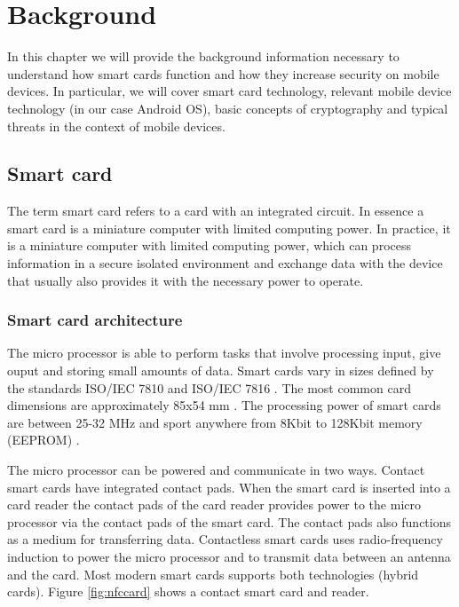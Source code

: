 \chapter{Background}
In this chapter we will provide the background information necessary to understand how smart cards function and how they increase security on mobile devices. In particular, we will cover smart card technology, relevant mobile device technology (in our case Android OS), basic concepts of cryptography and typical threats in the context of mobile devices.

\section{Smart card}
\label{sec:smartcard}
The term smart card refers to a card with an integrated circuit. In essence a smart card is a miniature computer with limited computing power. In practice, it is a miniature computer with limited computing power, which can process information in a secure isolated environment and exchange data with the device that usually also provides it with the necessary power to operate.

\subsection{Smart card architecture}
The micro processor is able to perform tasks that involve processing input, give ouput and storing small amounts of data. Smart cards vary in sizes defined by the standards ISO/IEC 7810 \cite{iso7810} and ISO/IEC 7816 \cite{iso7816}. The most common card dimensions are approximately 85x54 mm \cite[~Ch. 3.1]{smartcardHandbook}. The processing power of smart cards are between 25-32 MHz and sport anywhere from 8Kbit to 128Kbit memory (EEPROM) \cite{cardProcessing}.

The micro processor can be powered and communicate in two ways. Contact smart cards have integrated contact pads. When the smart card is inserted into a card reader the contact pads of the card reader provides power to the micro processor via the contact pads of the smart card. The contact pads also functions as a medium for transferring data. Contactless smart cards uses radio-frequency induction to power the micro processor and to transmit data between an antenna and the card. Most modern smart cards supports both technologies (hybrid cards). Figure \ref{fig:nfccard} shows a contact smart card and reader.

